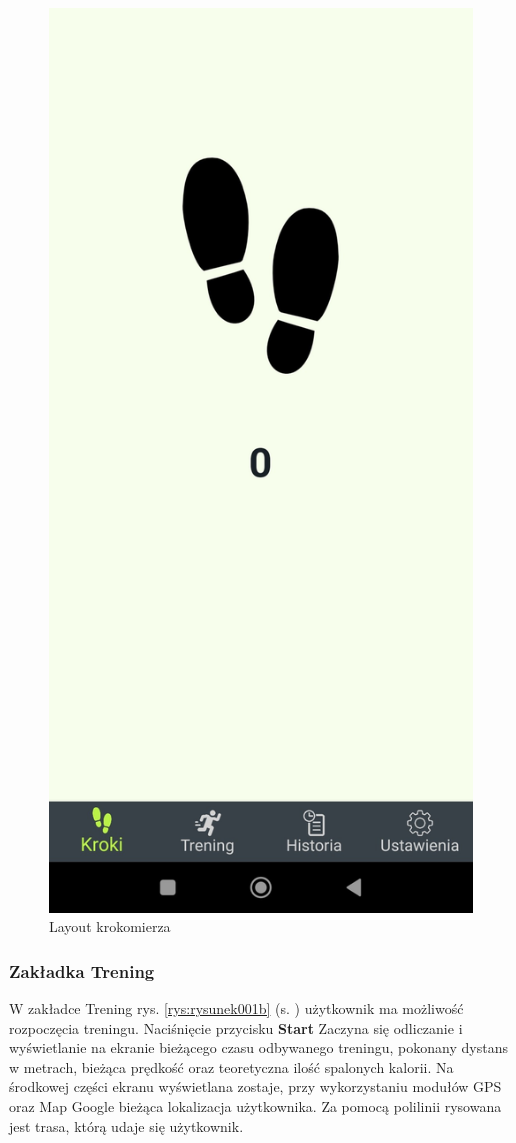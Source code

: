 \begin{figure}[!htb]
	\centering
	\includegraphics[width=.2\linewidth]{rys/kroki2.jpg}
	\caption{Layout krokomierza}
	\label{rys:rysunek001a}
\end{figure}

\subsubsection{Zakładka Trening} %

\hspace{0.60cm}W zakładce Trening rys. \ref{rys:rysunek001b} (s. \pageref{rys:rysunek001b}) użytkownik ma możliwość rozpoczęcia treningu. Naciśnięcie przycisku \textbf{Start} Zaczyna się odliczanie i wyświetlanie na ekranie bieżącego czasu odbywanego treningu, pokonany dystans w metrach, bieżąca prędkość oraz teoretyczna ilość spalonych kalorii. Na środkowej części ekranu wyświetlana zostaje, przy wykorzystaniu modułów GPS oraz  Map Google bieżąca lokalizacja użytkownika. Za pomocą polilinii rysowana jest trasa, którą udaje się użytkownik. 

